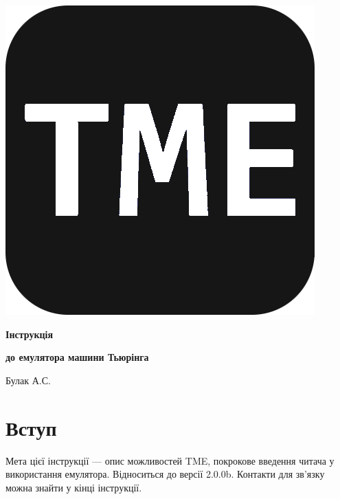 \documentclass[oneside,final,14pt]{extreport}
\begin{document}
\begin{centering}

\thispagestyle{empty} %
\begin{minipage}[t]{16.75cm}

\begin{center}
\includegraphics[scale=0.1]{0}
\end{center}

\vspace{9cm}

\centerline{\Huge  \bfseries Інструкція}
\centerline{\Large \bfseries до емулятора машини Тьюрінга}

\vspace{11,9cm}

\centerline{Булак А.С.}
\vspace{0,2cm}


\end{minipage}

\end{centering}


\pagebreak
	
\tableofcontents
\pagebreak
\setcounter{page}{2}
	
\chapter*{Вступ}
Мета цієї інструкції --- опис можливостей TME, покрокове введення читача у використання емулятора. Відноситься до версії 2.0.0b. Контакти для зв'язку можна знайти у кінці інструкції.
\end{document}
